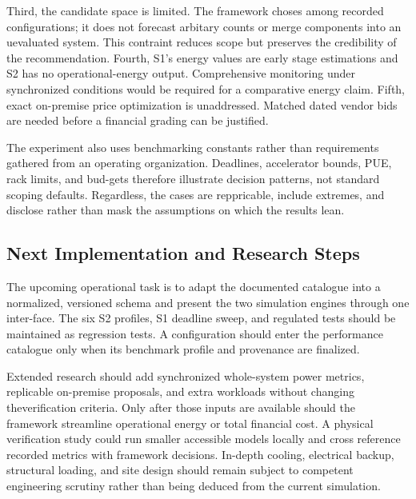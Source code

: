 \documentclass[final,3p,12pt,nopreprintline]{elsarticle}
\begin{document}
Third, the candidate space is limited. The framework choses among recorded configurations; it does not forecast arbitary counts or merge components into an uevaluated system. This contraint reduces scope but preserves the credibility of the recommendation. Fourth, S1’s energy values are early stage estimations and S2 has no operational-energy output. Comprehensive monitoring under synchronized conditions would be required for a comparative energy claim. Fifth, exact on-premise price optimization is unaddressed. Matched dated vendor bids are needed before a financial grading can be justified.


The experiment also uses benchmarking constants rather than requirements gathered from an operating organization. Deadlines, accelerator bounds, PUE, rack limits, and bud-gets therefore illustrate decision patterns, not standard scoping defaults. Regardless, the cases are reppricable, include extremes, and disclose rather than mask the assumptions on which the results lean.


\subsection{Next Implementation and Research Steps}


The upcoming operational task is to adapt the documented catalogue into a normalized, versioned schema and present the two simulation engines through one inter-face. The six S2 profiles, S1 deadline sweep, and regulated tests should be maintained as regression tests. A configuration should enter the performance catalogue only when its benchmark profile and provenance are finalized.


Extended research should add synchronized whole-system power metrics, replicable on-premise proposals, and extra workloads without changing theverification criteria. Only after those inputs are available should the framework streamline operational energy or total financial cost. A physical verification study could run smaller accessible models locally and cross reference recorded metrics with framework decisions. In-depth cooling, electrical backup, structural loading, and site design should remain subject to competent engineering scrutiny rather than being deduced from the current simulation.
\end{document}
